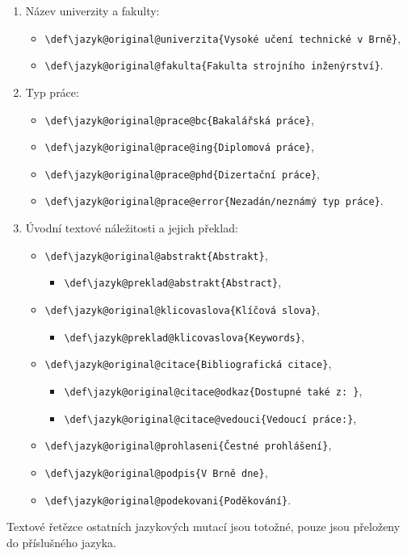 \begin{enumerate}
	\item Název univerzity a fakulty:
		\begin{itemize}[label=-]
			\item \verb|\def\jazyk@original@univerzita{Vysoké učení technické v Brně}|,
			\item \verb|\def\jazyk@original@fakulta{Fakulta strojního inženýrství}|.
		\end{itemize}
	\item Typ práce:
		\begin{itemize}[label=-]
			\item \verb|\def\jazyk@original@prace@bc{Bakalářská práce}|,
			\item \verb|\def\jazyk@original@prace@ing{Diplomová práce}|,
			\item \verb|\def\jazyk@original@prace@phd{Dizertační práce}|,
			\item \verb|\def\jazyk@original@prace@error{Nezadán/neznámý typ práce}|.
		\end{itemize}
	\item Úvodní textové náležitosti a jejich překlad:
		\begin{itemize}[label=-]
			\item \verb|\def\jazyk@original@abstrakt{Abstrakt}|,
			\begin{itemize}[label=-]
				\item \verb|\def\jazyk@preklad@abstrakt{Abstract}|,
			\end{itemize}
			\item \verb|\def\jazyk@original@klicovaslova{Klíčová slova}|,
			\begin{itemize}[label=-]
				\item \verb|\def\jazyk@preklad@klicovaslova{Keywords}|,
			\end{itemize}
			\item \verb|\def\jazyk@original@citace{Bibliografická citace}|,
			\begin{itemize}[label=-]
				\item \verb|\def\jazyk@original@citace@odkaz{Dostupné také z: }|,
				\item \verb|\def\jazyk@original@citace@vedouci{Vedoucí práce:}|,
			\end{itemize}
			\item \verb|\def\jazyk@original@prohlaseni{Čestné prohlášení}|,
			\item \verb|\def\jazyk@original@podpis{V Brně dne}|,
			\item \verb|\def\jazyk@original@podekovani{Poděkování}|.
		\end{itemize}
\end{enumerate}

Textové řetězce ostatních jazykových mutací jsou totožné, pouze jsou přeloženy do příslušného jazyka.

